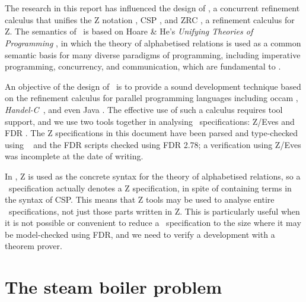\documentclass{report}
\newcommand{\HandelC}{\textsf{\slshape Handel-C}}
\begin{document}

\section{\Circus}

The research in this report has influenced the design of \Circus, a
concurrent refinement calculus \cite{woodcock-cavalcanti-01} that
unifies the Z notation \cite{spivey-88, potter-sinclair-till-91,
  spivey-92, woodcock-davies-96}, CSP \cite{hoare-85, roscoe-98}, and
ZRC \cite{cavalcanti-97, cavalcanti-woodcock-98}, a refinement
calculus for Z.  The semantics of \Circus\ is based on Hoare \& He's
\emph{Unifying Theories of Programming} \cite{hoare-he-98}, in which
the theory of alphabetised relations is used as a common semantic
basis for many diverse paradigms of programming, including imperative
programming, concurrency, and communication, which are fundamental to
\Circus.

An objective of the design of \Circus\ is to provide a sound
development technique based on the refinement calculus \cite
{morgan-94} for parallel programming languages including
\textsf{occam} \cite{inmos-84}, \HandelC\
\cite{embedded-solutions-ltd-99}, and even Java
\cite{arnold-gosling-96, cavalcanti-sampaio-01}.  The effective use of
such a calculus requires tool support, and we use two tools together
in analysing \Circus\ specifications: Z/Eves
\cite{meisels-saaltink-97, saaltink-97} and FDR
\cite{formal-systems-97}.  The Z specifications in this document have
been parsed and type-checked using \fuzz\ \cite{spivey-95} and the FDR
scripts checked using FDR 2.78; a verification using Z/Eves was
incomplete at the date of writing.

In \cite{woodcock-cavalcanti-01}, Z is used as the concrete syntax for
the theory of alphabetised relations, so a \Circus\ specification
actually denotes a Z specification, in spite of containing terms in
the syntax of CSP.  This means that Z tools may be used to analyse
entire \Circus\ specifications, not just those parts written in Z.
This is particularly useful when it is not possible or convenient to
reduce a \Circus\ specification to the size where it may be
model-checked using FDR, and we need to verify a development with a
theorem prover.


\section{The steam boiler problem}
\end{document}
